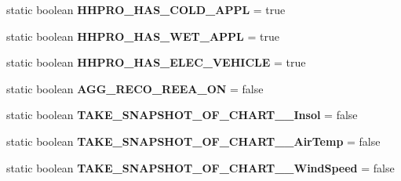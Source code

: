 \begin{DoxyCompactItemize}
\item 
\hypertarget{classuk_1_1ac_1_1dmu_1_1iesd_1_1cascade_1_1base_1_1_consts_a9074c8b1fad1f66f93362ad45bf4bea1}{static boolean {\bfseries H\-H\-P\-R\-O\-\_\-\-H\-A\-S\-\_\-\-C\-O\-L\-D\-\_\-\-A\-P\-P\-L} = true}\label{classuk_1_1ac_1_1dmu_1_1iesd_1_1cascade_1_1base_1_1_consts_a9074c8b1fad1f66f93362ad45bf4bea1}

\item 
\hypertarget{classuk_1_1ac_1_1dmu_1_1iesd_1_1cascade_1_1base_1_1_consts_a78a3614274ad7a089626e5413e2c3c00}{static boolean {\bfseries H\-H\-P\-R\-O\-\_\-\-H\-A\-S\-\_\-\-W\-E\-T\-\_\-\-A\-P\-P\-L} = true}\label{classuk_1_1ac_1_1dmu_1_1iesd_1_1cascade_1_1base_1_1_consts_a78a3614274ad7a089626e5413e2c3c00}

\item 
\hypertarget{classuk_1_1ac_1_1dmu_1_1iesd_1_1cascade_1_1base_1_1_consts_a2447f775071fbf50cef8a13ce583c38c}{static boolean {\bfseries H\-H\-P\-R\-O\-\_\-\-H\-A\-S\-\_\-\-E\-L\-E\-C\-\_\-\-V\-E\-H\-I\-C\-L\-E} = true}\label{classuk_1_1ac_1_1dmu_1_1iesd_1_1cascade_1_1base_1_1_consts_a2447f775071fbf50cef8a13ce583c38c}

\item 
\hypertarget{classuk_1_1ac_1_1dmu_1_1iesd_1_1cascade_1_1base_1_1_consts_aedcd9acf5690f2c04cdb14ce61ecb5c4}{static boolean {\bfseries A\-G\-G\-\_\-\-R\-E\-C\-O\-\_\-\-R\-E\-E\-A\-\_\-\-O\-N} = false}\label{classuk_1_1ac_1_1dmu_1_1iesd_1_1cascade_1_1base_1_1_consts_aedcd9acf5690f2c04cdb14ce61ecb5c4}

\item 
\hypertarget{classuk_1_1ac_1_1dmu_1_1iesd_1_1cascade_1_1base_1_1_consts_a53cdf608d03abdcfe90d801950285419}{static boolean {\bfseries T\-A\-K\-E\-\_\-\-S\-N\-A\-P\-S\-H\-O\-T\-\_\-\-O\-F\-\_\-\-C\-H\-A\-R\-T\-\_\-\_\-\-Insol} = false}\label{classuk_1_1ac_1_1dmu_1_1iesd_1_1cascade_1_1base_1_1_consts_a53cdf608d03abdcfe90d801950285419}

\item 
\hypertarget{classuk_1_1ac_1_1dmu_1_1iesd_1_1cascade_1_1base_1_1_consts_a9042f7a11ceb0e4943fd46519cb60422}{static boolean {\bfseries T\-A\-K\-E\-\_\-\-S\-N\-A\-P\-S\-H\-O\-T\-\_\-\-O\-F\-\_\-\-C\-H\-A\-R\-T\-\_\-\_\-\-Air\-Temp} = false}\label{classuk_1_1ac_1_1dmu_1_1iesd_1_1cascade_1_1base_1_1_consts_a9042f7a11ceb0e4943fd46519cb60422}

\item 
\hypertarget{classuk_1_1ac_1_1dmu_1_1iesd_1_1cascade_1_1base_1_1_consts_a1c3b37eb511865fea1a5e3da03c4a4be}{static boolean {\bfseries T\-A\-K\-E\-\_\-\-S\-N\-A\-P\-S\-H\-O\-T\-\_\-\-O\-F\-\_\-\-C\-H\-A\-R\-T\-\_\-\_\-\-Wind\-Speed} = false}\label{classuk_1_1ac_1_1dmu_1_1iesd_1_1cascade_1_1base_1_1_consts_a1c3b37eb511865fea1a5e3da03c4a4be}


\end{DoxyCompactItemize}
